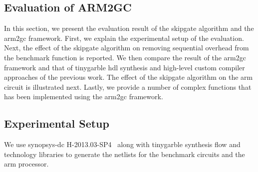 
\subsection{Evaluation of ARM2GC}\label{sec:eval-arm2gc}
In this section, we present the evaluation result of the \gls{skipgate} algorithm and the \gls{arm2gc} framework.
First, we explain the experimental setup of the evaluation.
Next, the effect of the \gls{skipgate} algorithm on removing sequential overhead from the benchmark function is reported.
We then compare the result of the \gls{arm2gc} framework and that of \gls{tinygarble} \acrshort{hdl} synthesis and high-level custom compiler approaches of the previous work.
The effect of the \gls{skipgate} algorithm on the \gls{arm} circuit is illustrated next.
Lastly, we provide a number of complex functions that has been implemented using the \gls{arm2gc} framework.

\subsection{Experimental Setup}
We use \gls{synopsys-dc} H-2013.03-SP4~\cite{tool:DesignCompiler} along with \gls{tinygarble} synthesis flow and technology libraries to generate the \gls{netlist}s for the benchmark circuits and the \gls{arm} processor.

